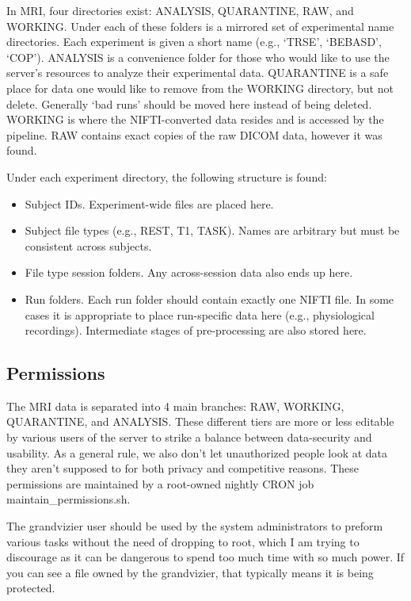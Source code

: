 \documentclass[final,titlepage,letterpaper,oneside,12pt]{article}
\renewcommand{\texttt}[2][BrickRed]{\textcolor{#1}{\ttfamily #2}}%
\begin{document}
In \texttt{MRI}, four directories exist: \texttt{ANALYSIS}, \texttt{QUARANTINE}, \texttt{RAW}, and \texttt{WORKING}. Under each of these folders is a mirrored set of experimental name directories. Each experiment is given a short name (e.g., `TRSE', `BEBASD', `COP'). \texttt{ANALYSIS} is a convenience folder for those who would like to use the server's resources to analyze their experimental data. \texttt{QUARANTINE} is a safe place for data one would like to remove from the \texttt{WORKING} directory, but not delete. Generally `bad runs' should be moved here instead of being deleted. \texttt{WORKING} is where the NIFTI-converted data resides and is accessed by the pipeline. \texttt{RAW} contains exact copies of the raw DICOM data, however it was found.

Under each experiment directory, the following structure is found:

\begin{itemize} \itemsep-2pt
    \item{Subject IDs. Experiment-wide files are placed here.}
    \item{Subject file types (e.g., REST, T1, TASK). Names are arbitrary but must be consistent across subjects.}
    \item{File type session folders. Any across-session data also ends up here.}
    \item{Run folders. Each run folder should contain exactly one NIFTI file. In some cases it is appropriate to place run-specific data here (e.g., physiological recordings). Intermediate stages of pre-processing are also stored here.}
\end{itemize}

\subsection{Permissions}

The MRI data is separated into 4 main branches: RAW, WORKING, QUARANTINE, and ANALYSIS. These different tiers are more or less editable by various users of the server to strike a balance between data-security and usability. As a general rule, we also don't let unauthorized people look at data they aren't supposed to for both privacy and competitive reasons. These permissions are maintained by a \texttt{root}-owned nightly \texttt{CRON} job {\color{red}\texttt{maintain\_permissions.sh}}.

The \texttt{grandvizier} user should be used by the system administrators to preform various tasks without the need of dropping to \texttt{root}, which I am trying to discourage as it can be dangerous to spend too much time with so much power. If you can see a file owned by the \texttt{grandvizier}, that typically means it is being protected.  
\end{document}
